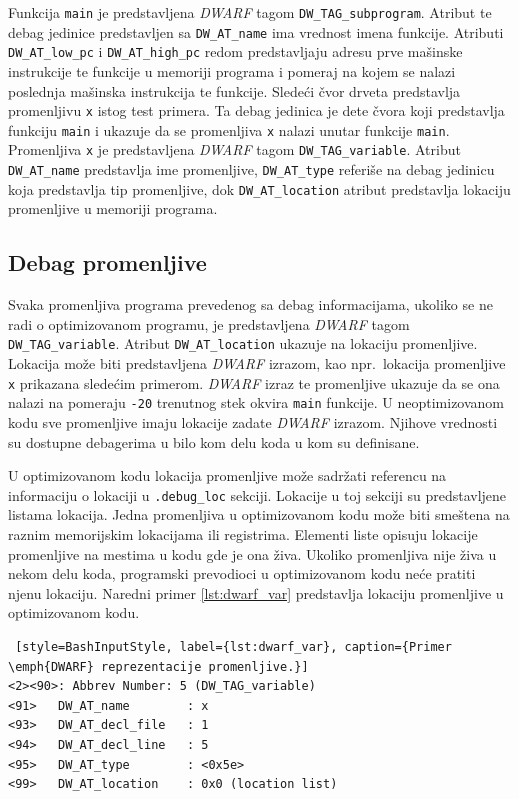 \documentclass[12pt,oneside]{memoir}
\begin{document}
Funkcija \texttt{main} je predstavljena \emph{DWARF} tagom \texttt{DW\_TAG\_subprogram}. Atribut te debag jedinice predstavljen sa \texttt{DW\_AT\_name} ima vrednost imena funkcije. Atributi \texttt{DW\_AT\_low\_pc} i \texttt{DW\_AT\_high\_pc} redom predstavljaju adresu prve mašinske instrukcije te funkcije u memoriji programa i pomeraj na kojem se nalazi poslednja mašinska instrukcija te funkcije. Sledeći čvor drveta predstavlja promenljivu \texttt{x} istog test primera. Ta debag jedinica je dete čvora koji predstavlja funkciju \texttt{main} i ukazuje da se promenljiva \texttt{x} nalazi unutar funkcije \texttt{main}. Promenljiva \texttt{x} je predstavljena \emph{DWARF} tagom \texttt{DW\_TAG\_variable}. Atribut \texttt{DW\_AT\_name} predstavlja ime promenljive, \texttt{DW\_AT\_type} referiše na debag jedinicu koja predstavlja tip promenljive, dok \texttt{DW\_AT\_location} atribut predstavlja lokaciju promenljive u memoriji programa. 

\subsection{Debag promenljive}

Svaka promenljiva programa prevedenog sa debag informacijama, ukoliko se ne radi o optimizovanom programu, je predstavljena \emph{DWARF} tagom \texttt{DW\_TAG\_variable}. Atribut \texttt{DW\_AT\_location} ukazuje na lokaciju promenljive. Lokacija može biti predstavljena \emph{DWARF} izrazom, kao npr.~lokacija promenljive \texttt{x} prikazana sledećim primerom. \emph{DWARF} izraz te promenljive ukazuje da se ona nalazi na pomeraju \texttt{-20} trenutnog stek okvira \texttt{main} funkcije. U neoptimizovanom kodu sve promenljive imaju lokacije zadate \emph{DWARF} izrazom. Njihove vrednosti su dostupne debagerima u bilo kom delu koda u kom su definisane.

U optimizovanom kodu lokacija promenljive može sadržati referencu na informaciju o lokaciji u \texttt{.debug\_loc} sekciji. Lokacije u toj sekciji su predstavljene listama lokacija. Jedna promenljiva u optimizovanom kodu može biti smeštena na raznim memorijskim lokacijama ili registrima. Elementi liste opisuju lokacije promenljive na mestima u kodu gde je ona živa. Ukoliko promenljiva nije živa u nekom delu koda, programski prevodioci u optimizovanom kodu neće pratiti njenu lokaciju. Naredni primer \ref{lst:dwarf_var} predstavlja lokaciju promenljive u optimizovanom kodu.

\begin{lstlisting} [style=BashInputStyle, label={lst:dwarf_var}, caption={Primer \emph{DWARF} reprezentacije promenljive.}]
<2><90>: Abbrev Number: 5 (DW_TAG_variable)
<91>   DW_AT_name        : x
<93>   DW_AT_decl_file   : 1
<94>   DW_AT_decl_line   : 5
<95>   DW_AT_type        : <0x5e>
<99>   DW_AT_location    : 0x0 (location list)
\end{lstlisting}
\end{document}
